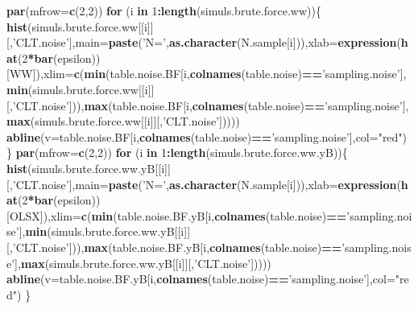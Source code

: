 \documentclass[]{book}
\newenvironment{Shaded}{\begin{snugshade}}{\end{snugshade}}
\newcommand{\ControlFlowTok}[1]{\textcolor[rgb]{0.13,0.29,0.53}{\textbf{#1}}}
\newcommand{\DataTypeTok}[1]{\textcolor[rgb]{0.13,0.29,0.53}{#1}}
\newcommand{\DecValTok}[1]{\textcolor[rgb]{0.00,0.00,0.81}{#1}}
\newcommand{\KeywordTok}[1]{\textcolor[rgb]{0.13,0.29,0.53}{\textbf{#1}}}
\newcommand{\NormalTok}[1]{#1}
\newcommand{\OperatorTok}[1]{\textcolor[rgb]{0.81,0.36,0.00}{\textbf{#1}}}
\newcommand{\StringTok}[1]{\textcolor[rgb]{0.31,0.60,0.02}{#1}}
\theoremstyle{definition}
\theoremstyle{definition}
\theoremstyle{definition}
\theoremstyle{remark}
\begin{document}
\begin{Shaded}
\begin{Highlighting}[]
\KeywordTok{par}\NormalTok{(}\DataTypeTok{mfrow=}\KeywordTok{c}\NormalTok{(}\DecValTok{2}\NormalTok{,}\DecValTok{2}\NormalTok{))}
\ControlFlowTok{for}\NormalTok{ (i }\ControlFlowTok{in} \DecValTok{1}\OperatorTok{:}\KeywordTok{length}\NormalTok{(simuls.brute.force.ww))\{}
  \KeywordTok{hist}\NormalTok{(simuls.brute.force.ww[[i]][,}\StringTok{'CLT.noise'}\NormalTok{],}\DataTypeTok{main=}\KeywordTok{paste}\NormalTok{(}\StringTok{'N='}\NormalTok{,}\KeywordTok{as.character}\NormalTok{(N.sample[i])),}\DataTypeTok{xlab=}\KeywordTok{expression}\NormalTok{(}\KeywordTok{hat}\NormalTok{(}\DecValTok{2}\OperatorTok{*}\KeywordTok{bar}\NormalTok{(epsilon))[WW]),}\DataTypeTok{xlim=}\KeywordTok{c}\NormalTok{(}\KeywordTok{min}\NormalTok{(table.noise.BF[i,}\KeywordTok{colnames}\NormalTok{(table.noise)}\OperatorTok{==}\StringTok{'sampling.noise'}\NormalTok{],}\KeywordTok{min}\NormalTok{(simuls.brute.force.ww[[i]][,}\StringTok{'CLT.noise'}\NormalTok{])),}\KeywordTok{max}\NormalTok{(table.noise.BF[i,}\KeywordTok{colnames}\NormalTok{(table.noise)}\OperatorTok{==}\StringTok{'sampling.noise'}\NormalTok{],}\KeywordTok{max}\NormalTok{(simuls.brute.force.ww[[i]][,}\StringTok{'CLT.noise'}\NormalTok{]))))}
  \KeywordTok{abline}\NormalTok{(}\DataTypeTok{v=}\NormalTok{table.noise.BF[i,}\KeywordTok{colnames}\NormalTok{(table.noise)}\OperatorTok{==}\StringTok{'sampling.noise'}\NormalTok{],}\DataTypeTok{col=}\StringTok{"red"}\NormalTok{)}
\NormalTok{\}}
\KeywordTok{par}\NormalTok{(}\DataTypeTok{mfrow=}\KeywordTok{c}\NormalTok{(}\DecValTok{2}\NormalTok{,}\DecValTok{2}\NormalTok{))}
\ControlFlowTok{for}\NormalTok{ (i }\ControlFlowTok{in} \DecValTok{1}\OperatorTok{:}\KeywordTok{length}\NormalTok{(simuls.brute.force.ww.yB))\{}
  \KeywordTok{hist}\NormalTok{(simuls.brute.force.ww.yB[[i]][,}\StringTok{'CLT.noise'}\NormalTok{],}\DataTypeTok{main=}\KeywordTok{paste}\NormalTok{(}\StringTok{'N='}\NormalTok{,}\KeywordTok{as.character}\NormalTok{(N.sample[i])),}\DataTypeTok{xlab=}\KeywordTok{expression}\NormalTok{(}\KeywordTok{hat}\NormalTok{(}\DecValTok{2}\OperatorTok{*}\KeywordTok{bar}\NormalTok{(epsilon))[OLSX]),}\DataTypeTok{xlim=}\KeywordTok{c}\NormalTok{(}\KeywordTok{min}\NormalTok{(table.noise.BF.yB[i,}\KeywordTok{colnames}\NormalTok{(table.noise)}\OperatorTok{==}\StringTok{'sampling.noise'}\NormalTok{],}\KeywordTok{min}\NormalTok{(simuls.brute.force.ww.yB[[i]][,}\StringTok{'CLT.noise'}\NormalTok{])),}\KeywordTok{max}\NormalTok{(table.noise.BF.yB[i,}\KeywordTok{colnames}\NormalTok{(table.noise)}\OperatorTok{==}\StringTok{'sampling.noise'}\NormalTok{],}\KeywordTok{max}\NormalTok{(simuls.brute.force.ww.yB[[i]][,}\StringTok{'CLT.noise'}\NormalTok{]))))}
  \KeywordTok{abline}\NormalTok{(}\DataTypeTok{v=}\NormalTok{table.noise.BF.yB[i,}\KeywordTok{colnames}\NormalTok{(table.noise)}\OperatorTok{==}\StringTok{'sampling.noise'}\NormalTok{],}\DataTypeTok{col=}\StringTok{"red"}\NormalTok{)}
\NormalTok{\}}
\end{Highlighting}
\end{Shaded}
\end{document}
